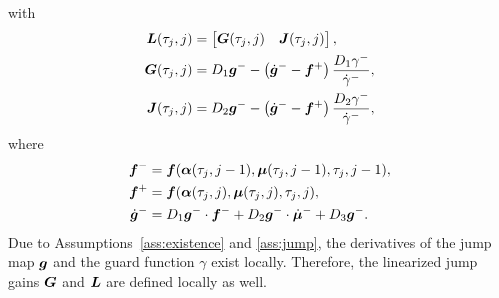 \documentclass[../DC2017114Bouma.tex]{subfiles}
\begin{document}
with 
\begin{align}
{\boldsymbol{L}}(\tau_j,j) &= \begin{bmatrix}
{\boldsymbol{G}}(\tau_j,j) & {\boldsymbol{J}}(\tau_j,j)
\end{bmatrix},\\
{\boldsymbol{G}}(\tau_j,j) & = D_1{\boldsymbol{g}}^- - \left(\dot{{\boldsymbol{g}}}^- - {\boldsymbol{f}}^+\right)\frac{D_1\gamma^-}{\dot{\gamma}^-},\\
{\boldsymbol{J}}(\tau_j,j) & = D_2{\boldsymbol{g}}^- - \left(\dot{{\boldsymbol{g}}}^- - {\boldsymbol{f}}^+\right)\frac{D_2\gamma^-}{\dot{\gamma}^-},
\end{align}
where
\begin{align}
{\boldsymbol{f}}^- &= {\boldsymbol{f}}(\boldsymbol{\alpha}(\tau_j,j-1),\boldsymbol{\mu}(\tau_j,j-1),\tau_j,j-1),\\
{\boldsymbol{f}}^+ &= {\boldsymbol{f}}(\boldsymbol{\alpha}(\tau_j,j),\boldsymbol{\mu}(\tau_j,j),\tau_j,j),\\
\dot{{\boldsymbol{g}}}^- &= D_1{\boldsymbol{g}}^-\cdot {\boldsymbol{f}}^- + D_2{\boldsymbol{g}}^-\cdot \dot{\boldsymbol{\mu}}^- + D_3{\boldsymbol{g}}^-.
\end{align}
Due to Assumptions~\ref{ass:existence} and \ref{ass:jump}, the derivatives of the jump map ${\boldsymbol{g}}$ and the guard function $\gamma$ exist locally. Therefore, the linearized jump gains ${\boldsymbol{G}}$ and ${\boldsymbol{L}}$ are defined locally as well.
\end{document}

